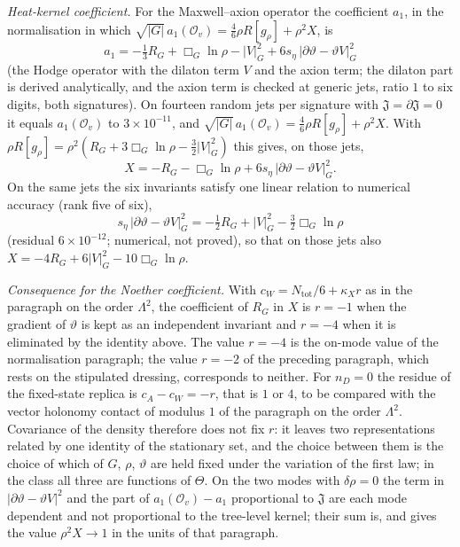 \emph{Heat-kernel coefficient.} For the Maxwell--axion operator the coefficient \(a_1\), in the normalisation in which \(\sqrt{\lvert G\rvert}\,a_1(\mathcal O_v)=\tfrac46\rho R[g_\rho]+\rho^2X\), is
\[
  a_1=-\tfrac13R_G+\Box_G\ln\rho-\lvert V\rvert_G^2+6s_\eta\,\lvert\partial\vartheta-\vartheta V\rvert_G^2
\]
(the Hodge operator with the dilaton term \(V\) and the axion term; the dilaton part is derived analytically, and the axion term is checked at generic jets, ratio \(1\) to six digits, both signatures). On fourteen random jets per signature with \(\mathfrak J=\partial\mathfrak J=0\) it equals \(a_1(\mathcal O_v)\) to \(3\times10^{-11}\), and \(\sqrt{\lvert G\rvert}\,a_1(\mathcal O_v)=\tfrac46\rho R[g_\rho]+\rho^2X\). With \(\rho R[g_\rho]=\rho^2(R_G+3\Box_G\ln\rho-\tfrac32\lvert V\rvert_G^2)\) this gives, on those jets,
\[
  X=-R_G-\Box_G\ln\rho+6s_\eta\,\lvert\partial\vartheta-\vartheta V\rvert_G^2 .
\]
On the same jets the six invariants satisfy one linear relation to numerical accuracy (rank five of six),
\[
  s_\eta\,\lvert\partial\vartheta-\vartheta V\rvert_G^2=-\tfrac12R_G+\lvert V\rvert_G^2-\tfrac32\Box_G\ln\rho
\]
(residual \(6\times10^{-12}\); numerical, not proved), so that on those jets also \(X=-4R_G+6\lvert V\rvert_G^2-10\Box_G\ln\rho\).

\emph{Consequence for the Noether coefficient.} With \(c_W=N_{\mathrm{tot}}/6+\kappa_Xr\) as in the paragraph on the order \(\Lambda^2\), the coefficient of \(R_G\) in \(X\) is \(r=-1\) when the gradient of \(\vartheta\) is kept as an independent invariant and \(r=-4\) when it is eliminated by the identity above. The value \(r=-4\) is the on-mode value of the normalisation paragraph; the value \(r=-2\) of the preceding paragraph, which rests on the stipulated dressing, corresponds to neither. For \(n_D=0\) the residue of the fixed-state replica is \(c_A-c_W=-r\), that is \(1\) or \(4\), to be compared with the vector holonomy contact of modulus \(1\) of the paragraph on the order \(\Lambda^2\). Covariance of the density therefore does not fix \(r\): it leaves two representations related by one identity of the stationary set, and the choice between them is the choice of which of \(G\), \(\rho\), \(\vartheta\) are held fixed under the variation of the first law; in the class all three are functions of \(\Theta\). On the two modes with \(\delta\rho=0\) the term in \(\lvert\partial\vartheta-\vartheta V\rvert^2\) and the part of \(a_1(\mathcal O_v)-a_1\) proportional to \(\mathfrak J\) are each mode dependent and not proportional to the tree-level kernel; their sum is, and gives the value \(\rho^2X\to1\) in the units of that paragraph.

